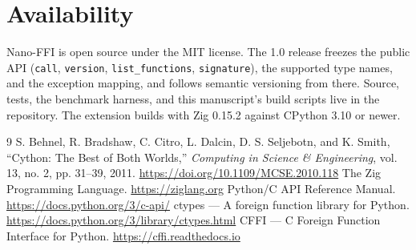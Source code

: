 \documentclass{jot}
\begin{document}
\section{Availability}

Nano-FFI is open source under the MIT license. The 1.0 release freezes the public API (\texttt{call}, \texttt{version}, \texttt{list\_functions}, \texttt{signature}), the supported type names, and the exception mapping, and follows semantic versioning from there. Source, tests, the benchmark harness, and this manuscript's build scripts live in the repository. The extension builds with Zig 0.15.2 against CPython 3.10 or newer.

\backmatter

\begin{thebibliography}{9}
 S. Behnel, R. Bradshaw, C. Citro, L. Dalcin, D. S. Seljebotn, and K. Smith, ``Cython: The Best of Both Worlds,'' \emph{Computing in Science \& Engineering}, vol. 13, no. 2, pp. 31--39, 2011. \url{https://doi.org/10.1109/MCSE.2010.118}
 The Zig Programming Language. \url{https://ziglang.org}
 Python/C API Reference Manual. \url{https://docs.python.org/3/c-api/}
 ctypes --- A foreign function library for Python. \url{https://docs.python.org/3/library/ctypes.html}
 CFFI --- C Foreign Function Interface for Python. \url{https://cffi.readthedocs.io}
\end{thebibliography}

\abouttheauthors
\end{document}
